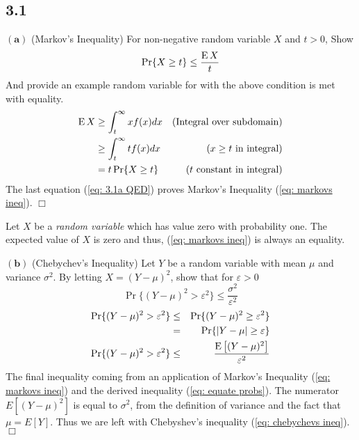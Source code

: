 \documentclass[10pt]{article}
\DeclareMathOperator*{\E}{\mbox{\text{E}}}
\newcommand{\pref}[1]{{(\ref{#1})}}
\begin{document}
\begin{scriptsize}
\begin{multicols}{3}
\section*{3.1}
$\mathbf{(a)}$
(Markov's Inequality) For non-negative random variable $X$ and  $t>0$,
Show
\begin{equation}
    \Pr\{X \geq t\} \leq \frac{\E X}{t} \label{eq: markovs ineq}
\end{equation}
And provide an example random variable for with the above condition is met
with equality.
\proof
\begin{eqnarray}
    \E X %
    &\geq \int_t^\infty x f(x)dx &\text{(Integral over subdomain)} 
    \nonumber \\
    &\geq \int_t^\infty t f(x)dx &\text{($x \geq t$ in integral)} 
        \nonumber \\
    &= t \Pr\{X \geq t\}  &\text{($t$ constant in integral)}
        \label{eq: 3.1a QED}
\end{eqnarray}
The last equation \pref{eq: 3.1a QED} proves Markov's Inequality
\pref{eq: markovs ineq}. $\Box$

Let $X$ be a \emph{random variable} which has value zero with probability
one.
The expected value of $X$ is zero and thus, 
\pref{eq: markovs ineq} is always an equality.

$\mathbf{(b)}$
(Chebychev's Inequality) Let $Y$ be a random variable with mean $\mu$ and
variance $\sigma^2$. By letting $X = (Y-\mu)^2$, show that for
$\varepsilon > 0$
\begin{equation}
    \Pr \{(Y-\mu)^2 > \varepsilon^2\} \leq \frac{\sigma^2}{\varepsilon^2}
    \label{eq: chebychevs ineq}
\end{equation}
\proof
\begin{eqnarray}
    \Pr\{(Y-\mu)^2 > \varepsilon^2\} &\leq& \Pr\{(Y-\mu)^2 \geq \varepsilon^2\}
        \nonumber \\
        &=& \Pr\{|Y-\mu| \geq \varepsilon\}
        \label{eq: equate probs} \\
    \Pr \{(Y-\mu)^2 > \varepsilon^2\} &\leq& \frac{\E \big[(Y-\mu)^2\big]}{\varepsilon^2}
        \label{eq:instatiate 3.1a}
\end{eqnarray}
The final inequality coming from an application of Markov's Inequality
\pref{eq: markovs ineq} and the derived inequality \pref{eq: equate probs}.
The numerator $E[(Y-\mu)^2]$ is equal to $\sigma^2$, from the definition
of variance and the fact that $\mu = E[Y]$. Thus we are left with
Chebyshev's inequality \pref{eq: chebychevs ineq}. $\Box$


\end{multicols}
\end{scriptsize}
\end{document}
